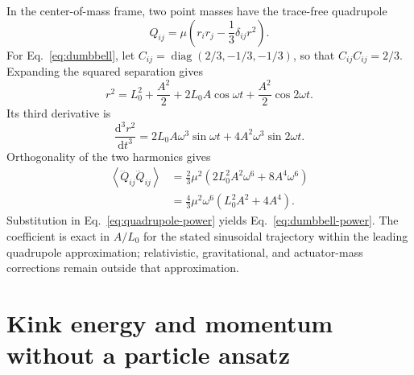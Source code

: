 \documentclass[11pt,a4paper]{article}
\numberwithin{equation}{section}
\newcommand{\dd}{\mathrm{d}}
\newcommand{\avg}[1]{\left\langle #1\right\rangle}
\begin{document}
In the center-of-mass frame, two point masses have the trace-free quadrupole
\begin{equation}
 Q_{ij}=\mu\left(r_i r_j-\frac13\delta_{ij}r^2\right).
\end{equation}
For Eq.~\eqref{eq:dumbbell}, let $C_{ij}=\operatorname{diag}(2/3,-1/3,-1/3)$, so that $C_{ij}C_{ij}=2/3$. Expanding the squared separation gives
\begin{equation}
 r^2=L_0^2+\frac{A^2}{2}+2L_0A\cos\omega t
 +\frac{A^2}{2}\cos2\omega t.
\end{equation}
Its third derivative is
\begin{equation}
 \frac{\dd^3r^2}{\dd t^3}
 =2L_0A\omega^3\sin\omega t
 +4A^2\omega^3\sin2\omega t.
\end{equation}
Orthogonality of the two harmonics gives
\begin{align}
 \avg{\dddot Q_{ij}\dddot Q_{ij}}
 &=\frac23\mu^2\left(2L_0^2A^2\omega^6+8A^4\omega^6\right)\\
 &=\frac43\mu^2\omega^6(L_0^2A^2+4A^4).
\end{align}
Substitution in Eq.~\eqref{eq:quadrupole-power} yields Eq.~\eqref{eq:dumbbell-power}. The coefficient is exact in $A/L_0$ for the stated sinusoidal trajectory within the leading quadrupole approximation; relativistic, gravitational, and actuator-mass corrections remain outside that approximation.

\section{Kink energy and momentum without a particle ansatz}
\label{app:kink}
\end{document}
